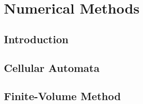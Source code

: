 \chapter{Numerical Methods}

\section{Introduction}

\section{Cellular Automata}

\section{Finite-Volume Method}
